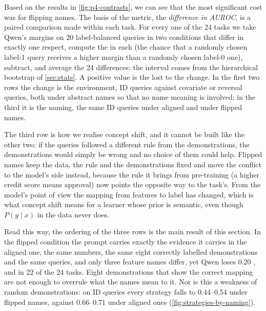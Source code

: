 
Based on the results in \autoref{fig:p4-contrasts}, we can see that the most significant cost was for flipping names. The basis of the metric, the \emph{difference in AUROC}, is a paired comparison made within each task. For every one of the 24 tasks we take Qwen's margins on 20 label-balanced queries in two conditions that differ in exactly one respect, compute the \AUROC in each (the chance that a randomly chosen label-1 query receives a higher margin than a randomly chosen label-0 one), subtract, and average the 24 differences; the interval comes from the hierarchical bootstrap of \autoref{sec:stats}. A positive value is the \AUROC lost to the change. In the first two rows the change is the environment, ID queries against covariate or reversal queries, both under abstract names so that no name meaning is involved; in the third it is the naming, the same ID queries under aligned and under flipped names.

The third row is how we realise concept shift, and it cannot be built like the other two: if the queries followed a different rule from the demonstrations, the demonstrations would simply be wrong and no choice of them could help. Flipped names keep the data, the rule and the demonstrations fixed and move the conflict to the model's side instead, because the rule it brings from pre-training (a higher credit score means approval) now points the opposite way to the task's. From the model's point of view the mapping from features to label has changed, which is what concept shift means for a learner whose prior is semantic, even though $P(y \mid x)$ in the data never does.

Read this way, the ordering of the three rows is the main result of this section. In the flipped condition the prompt carries exactly the evidence it carries in the aligned one, the same numbers, the same eight correctly labelled demonstrations and the same queries, and only three feature names differ, yet Qwen loses 0.20 \AUROC, and in 22 of the 24 tasks. Eight demonstrations that show the correct mapping are not enough to overrule what the names mean to it. Nor is this a weakness of random demonstrations: on ID queries every strategy falls to 0.44--0.54 under flipped names, against 0.66--0.71 under aligned ones (\autoref{fig:strategies-by-naming}).

